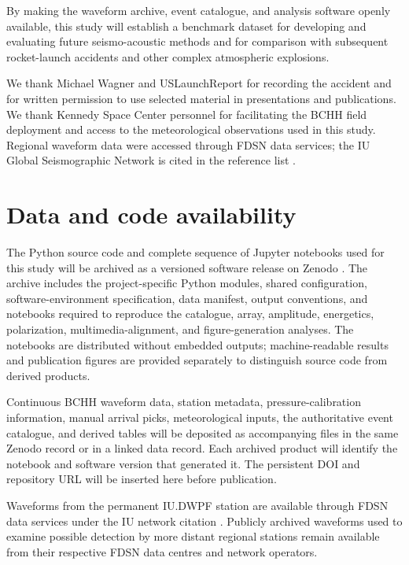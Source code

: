 \documentclass[]{seismica}
\begin{document}
By making the waveform archive, event catalogue, and analysis software openly available, this study will establish a benchmark dataset for developing and evaluating future seismo-acoustic methods and for comparison with subsequent rocket-launch accidents and other complex atmospheric explosions.

\begin{acknowledgements}
We thank Michael Wagner and USLaunchReport for recording the accident and for written permission to use selected material in presentations and publications. We thank Kennedy Space Center personnel for facilitating the BCHH field deployment and access to the meteorological observations used in this study. Regional waveform data were accessed through FDSN data services; the IU Global Seismographic Network is cited in the reference list \citep{asl_gsn_iu_1988}.
\end{acknowledgements}

\section*{Data and code availability}

The Python source code and complete sequence of Jupyter notebooks used for this study will be archived as a versioned software release on Zenodo \citep{thompson_falcon9_workflow_2026}. The archive includes the project-specific Python modules, shared configuration, software-environment specification, data manifest, output conventions, and notebooks required to reproduce the catalogue, array, amplitude, energetics, polarization, multimedia-alignment, and figure-generation analyses. The notebooks are distributed without embedded outputs; machine-readable results and publication figures are provided separately to distinguish source code from derived products.

Continuous BCHH waveform data, station metadata, pressure-calibration information, manual arrival picks, meteorological inputs, the authoritative event catalogue, and derived tables will be deposited as accompanying files in the same Zenodo record or in a linked data record. Each archived product will identify the notebook and software version that generated it. The persistent DOI and repository URL will be inserted here before publication.

Waveforms from the permanent IU.DWPF station are available through FDSN data services under the IU network citation \citep{asl_gsn_iu_1988}. Publicly archived waveforms used to examine possible detection by more distant regional stations remain available from their respective FDSN data centres and network operators.
\end{document}
